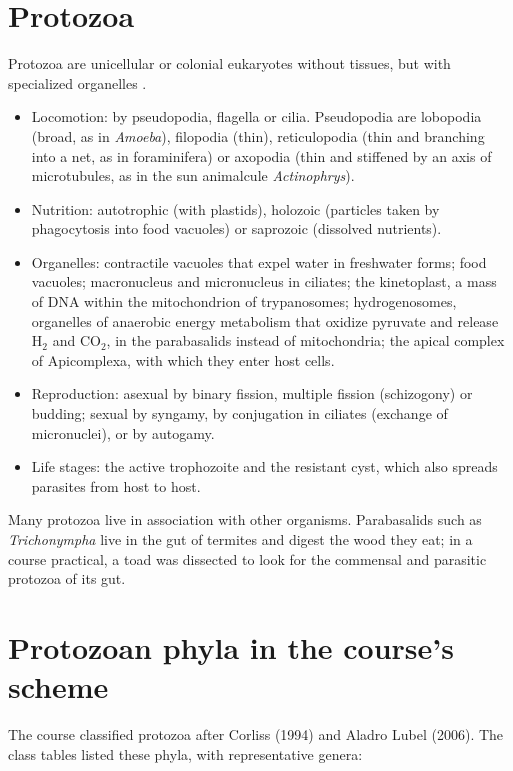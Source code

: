 \section{Protozoa}
\label{section-protozoa}

Protozoa are unicellular or colonial
eukaryotes without tissues, but with
specialized organelles \cite[Chapter
5]{hickman2002animal} \cite[Chapter
25]{willey2008prescott}.
\begin{itemize}
\item Locomotion: by pseudopodia, flagella or
cilia. Pseudopodia are lobopodia (broad, as
in \emph{Amoeba}), filopodia (thin),
reticulopodia (thin and branching into a net,
as in foraminifera) or axopodia (thin and
stiffened by an axis of microtubules, as in
the sun animalcule \emph{Actinophrys}).
\item Nutrition: autotrophic (with plastids),
holozoic (particles taken by phagocytosis
into food vacuoles) or saprozoic (dissolved
nutrients).
\item Organelles: contractile vacuoles that
expel water in freshwater forms; food
vacuoles; macronucleus and micronucleus in
ciliates; the kinetoplast, a mass of DNA
within the mitochondrion of trypanosomes;
hydrogenosomes, organelles of anaerobic
energy metabolism that oxidize pyruvate and
release $\mathrm{H_2}$ and $\mathrm{CO_2}$,
in the parabasalids instead of mitochondria;
the apical complex of Apicomplexa, with which
they enter host cells.
\item Reproduction: asexual by binary
fission, multiple fission (schizogony) or
budding; sexual by syngamy, by conjugation in
ciliates (exchange of micronuclei), or by
autogamy.
\item Life stages: the active trophozoite and
the resistant cyst, which also spreads
parasites from host to host.
\end{itemize}

Many protozoa live in association with other
organisms. Parabasalids such as
\emph{Trichonympha} live in the gut of
termites and digest the wood they eat; in a
course practical, a toad was dissected to
look for the commensal and parasitic protozoa
of its gut.

\section{Protozoan phyla in the course's
scheme}
\label{section-phyla}

The course classified protozoa after Corliss
(1994) and Aladro Lubel (2006). The class
tables listed these phyla, with
representative genera:

